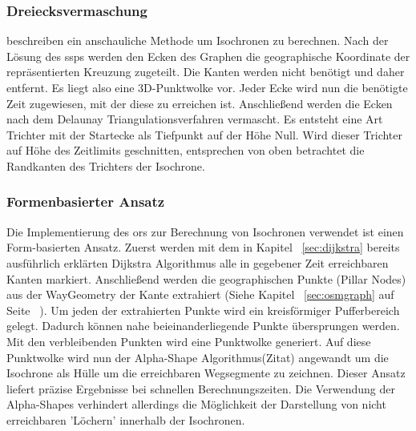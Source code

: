 \subsubsection{Dreiecksvermaschung}
\cite{isochrones} beschreiben ein anschauliche Methode um Isochronen zu berechnen. 
Nach der Lösung des \gls{ssp}s werden den Ecken des Graphen die geographische Koordinate der repräsentierten Kreuzung zugeteilt. Die Kanten werden nicht benötigt und daher entfernt. 
Es liegt also eine 3D-Punktwolke vor. 
Jeder Ecke wird nun die benötigte Zeit zugewiesen, mit der diese zu erreichen ist. 
Anschließend werden die Ecken nach dem Delaunay Triangulationsverfahren vermascht. 
Es entsteht eine Art Trichter mit der Startecke als Tiefpunkt auf der Höhe Null. 
Wird dieser Trichter auf Höhe des Zeitlimits geschnitten, entsprechen von oben betrachtet die Randkanten des Trichters der Isochrone.


\subsubsection{Formenbasierter Ansatz}
Die Implementierung des \gls{ors} zur Berechnung von Isochronen verwendet ist einen Form-basierten Ansatz. Zuerst werden mit dem in Kapitel ~\ref{sec:dijkstra} bereits ausführlich erklärten Dijkstra Algorithmus alle in gegebener Zeit erreichbaren Kanten markiert. Anschließend werden die geographischen Punkte (Pillar Nodes) aus der WayGeometry der Kante extrahiert (Siehe Kapitel ~\ref{sec:osmgraph} auf Seite ~\pageref{sec:osmgraph}). Um jeden der extrahierten Punkte wird ein kreisförmiger Pufferbereich gelegt. Dadurch können nahe beieinanderliegende Punkte übersprungen werden. Mit den verbleibenden Punkten wird eine Punktwolke generiert. Auf diese Punktwolke wird nun der Alpha-Shape Algorithmus(Zitat) angewandt um die Isochrone als Hülle um die erreichbaren Wegsegmente zu zeichnen.
Dieser Ansatz liefert präzise Ergebnisse bei schnellen Berechnungszeiten. Die Verwendung der Alpha-Shapes verhindert allerdings die Möglichkeit der Darstellung von nicht erreichbaren 'Löchern' innerhalb der Isochronen.

